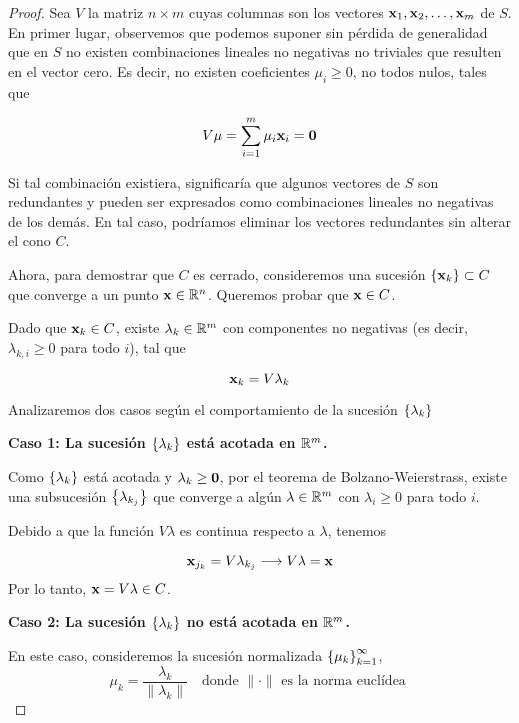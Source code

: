 \documentclass[a4paper,12pt]{article}
\begin{document}
\begin{proof}
    Sea $V$ la matriz $n\times m$ cuyas columnas son los vectores $\mathbf{x}_1, \mathbf{x}_2, \dots, \mathbf{x}_m$ de $S$.
    En primer lugar, observemos que podemos suponer sin pérdida de generalidad que en $S$ no existen combinaciones lineales no negativas no triviales que resulten en el vector cero. Es decir, no existen coeficientes $\mu_i\geq 0$, no todos nulos, tales que

    $$V\mu=\sum_{i=1}^m\mu_i\mathbf{x}_i=\mathbf{0}$$

    Si tal combinación existiera, significaría que algunos vectores de $S$ son redundantes y pueden ser expresados como combinaciones lineales no negativas de los demás. En tal caso, podríamos eliminar los vectores redundantes sin alterar el cono $C$.

    Ahora, para demostrar que $C$ es cerrado, consideremos una sucesión $\left\lbrace\mathbf{x}_k\right\rbrace\subset C$ que converge a un punto $\mathbf{x} \in\mathbb{R}^n$. Queremos probar que $\mathbf{x}\in C$.

    Dado que $\mathbf{x}_k\in C$, existe $\lambda_k\in \mathbb{R}^m$ con componentes no negativas (es decir, $\lambda_{k,i}\geq 0$ para todo $i$), tal que

    $$\mathbf{x}_k=V\lambda_k$$

    Analizaremos dos casos según el comportamiento de la sucesión $\left\lbrace\lambda_k\right\rbrace$

    \vspace{2mm} \textbf{Caso 1: La sucesión $\left\lbrace\lambda_k\right\rbrace$ está acotada en $\mathbb{R}^m$.}
    \vspace{2mm}

    Como $\left\lbrace\lambda_k\right\rbrace$ está acotada y $\lambda_k\geq \mathbf{0}$, por el teorema de Bolzano-Weierstrass, existe una subsucesión $\left\lbrace\lambda_{k_j}\right\rbrace$ que converge a algún $\lambda\in \mathbb{R}^m$ con $\lambda_i\geq 0$ para todo $i$.

    Debido a que la función $V\lambda$ es continua respecto a $\lambda$, tenemos

    $$\mathbf{x}_{j_k}=V\lambda_{k_j} \longrightarrow V\lambda=\mathbf{x}$$
    Por lo tanto, $\mathbf{x}=V\lambda \in C$.

    \vspace{2mm} \textbf{Caso 2: La sucesión $\left\lbrace\lambda_k\right\rbrace$ no está acotada en $\mathbb{R}^m$.}
    \vspace{2mm}

    En este caso, consideremos la sucesión normalizada $\left\lbrace\mu_k\right\rbrace_{k=1}^\infty$,
    $$\mu_k=\frac{\lambda_k}{\|\lambda_k\|}\quad\text{donde }\|\cdot\|\text{ es la norma euclídea }$$


\end{proof}
\end{document}
